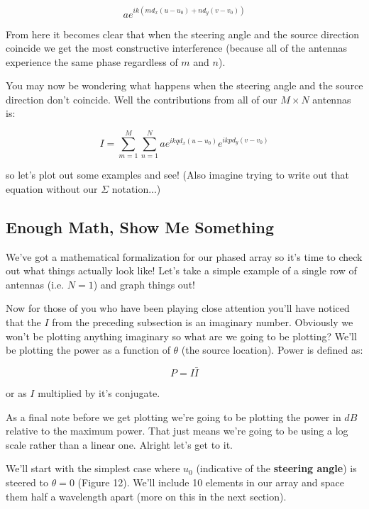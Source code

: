 \documentclass[10pt,a4paper]{article}
\begin{document}
\begin{equation}
ae^{ik(md_x(u-u_0)+nd_y(v-v_0))}
\end{equation}

From here it becomes clear that when the steering angle and the source direction coincide we get the most constructive interference (because all of the antennas experience the same phase regardless of $m$ and $n$).

You may now be wondering what happens when the steering angle and the source direction don't coincide. Well the contributions from all of our $M\times N$ antennas is:

\begin{equation}
I=\sum_{m=1}^M \sum_{n=1}^N  ae^{ikqd_x(u-u_0)}e^{ikpd_y(v-v_0)}
\end{equation}

so let's plot out some examples and see! (Also imagine trying to write out that equation without our $\Sigma$ notation...)

\subsection{Enough Math, Show Me Something}
We've got a mathematical formalization for our phased array so it's time to check out what things actually look like! Let's take a simple example of a single row of antennas (i.e. $N=1$) and graph things out!

Now for those of you who have been playing close attention you'll have noticed that the $I$ from the preceding subsection is an imaginary number. Obviously we won't be plotting anything imaginary so what are we going to be plotting? We'll be plotting the power as a function of $\theta$ (the source location). Power is defined as:

\begin{equation}
P=I\bar{I}
\end{equation}

or as $I$ multiplied by it's conjugate. 

As a final note before we get plotting we're going to be plotting the power in $dB$ relative to the maximum power. That just means we're going to be using a log scale rather than a linear one. Alright let's get to it.

We'll start with the simplest case where $u_0$ (indicative of the \textbf{steering angle}) is steered to $\theta=0$ (Figure 12). We'll include 10 elements in our array and space them half a wavelength apart (more on this in the next section). 
\end{document}

